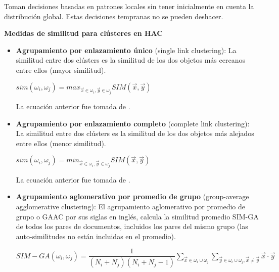 \documentclass{llncs}
\begin{document}
Toman decisiones basadas en patrones locales sin tener inicialmente en cuenta la distribución global. Estas decisiones tempranas no se pueden deshacer.

\vspace{1em}
\textbf{Medidas de similitud para cl\'usteres en HAC}

\begin{itemize}
	\item \textbf{Agrupamiento por enlazamiento \'unico} (single link clustering): La similitud entre dos cl\'usters es la similitud de los dos objetos más cercanos entre ellos (mayor similitud).
	
	\begin{center}
		$ sim(\omega_{i}, \omega_{j}) = max_{\overrightarrow{x} \in \omega_{i}, \overrightarrow{y} \in \omega_{j}} SIM(\overrightarrow{x}, \overrightarrow{y})$
	\end{center}
	
	La ecuaci\'on anterior fue tomada de \cite[p.50]{B2}.
	
	\vspace{1em}
	\item \textbf{Agrupamiento por enlazamiento completo} (complete link clustering): La similitud entre dos cl\'usters es la similitud de los dos objetos más alejados entre ellos (menor similitud). 
	
	\begin{center}
		$ sim(\omega_{i}, \omega_{j}) = min_{\overrightarrow{x} \in \omega_{i}, \overrightarrow{y} \in \omega_{j}} SIM(\overrightarrow{x}, \overrightarrow{y})$
	\end{center}
	
	La ecuaci\'on anterior fue tomada de \cite[p.51]{B2}.
	
	\vspace{1em}
	\item \textbf{Agrupamiento aglomerativo por promedio de grupo} (group-average agglomerative clustering): El agrupamiento aglomerativo por promedio de grupo o GAAC por sus siglas en ingl\'es, calcula la similitud promedio SIM-GA de todos los pares de documentos, incluidos los pares del mismo grupo (las auto-similitudes no están incluidas en el promedio).
	
	\begin{center}
	\footnotesize
	$ SIM-GA(\omega_{i}, \omega_{j}) = \dfrac{1}{(N_{i} + N_{j})(N_{i} + N_{j} - 1)} \sum_{\overrightarrow{x} \in \omega_{i} \cup \omega_{j}} \sum_{\overrightarrow{y} \in \omega_{i} \cup \omega_{j}, \overrightarrow{x} \neq \overrightarrow{y}} \overrightarrow{x} \cdot \overrightarrow{y} $
	\end{center}
	

\end{itemize}
\end{document}
